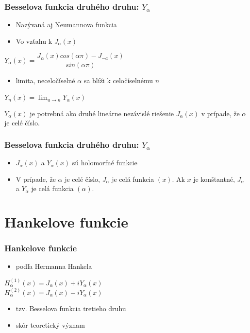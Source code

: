 \documentclass{beamer}
\begin{document}
\begin{frame}
\frametitle{Besselova funkcia druhého druhu: $Y_{\alpha}$}
\begin{itemize}
\item Nazývaná aj Neumannova funkcia
\item Vo vzťahu k $J_{\alpha}(x)$ 
\end{itemize}
\begin{center}
$Y_{\alpha}(x) = \dfrac{J_{\alpha}(x)cos(\alpha\pi)-J_{-a}(x)}{sin(\alpha\pi)} $
\end{center}
\begin{itemize}
\item limita, neceločíselné $\alpha$ sa blíži k celočíselnému $n$
\end{itemize}

\begin{center}
$Y_{n}(x) = \displaystyle\lim_{a\rightarrow n} Y_{\alpha}(x)$
\end{center}
$Y_{\alpha}(x) $ je potrebná ako druhé lineárne nezávislé riešenie $J_{\alpha}(x)$ v prípade, že $\alpha$ je celé číslo.
\end{frame}
\begin{frame}
\frametitle{Besselova funkcia druhého druhu: $Y_{\alpha}$}
\begin{itemize}
\item $J_{\alpha}(x)$ a $Y_{\alpha}(x)$ sú holomorfné funkcie

\item V prípade, že $\alpha$ je celé číslo, $J_{\alpha}$ je celá funkcia $(x)$.
Ak $x$ je konštantné, $J_{\alpha}$ a $Y_{\alpha}$ je celá funkcia $(\alpha)$.
\end{itemize}

\end{frame}

\section{Hankelove funkcie}
\begin{frame}
\frametitle{Hankelove funkcie}
\begin{itemize}
\item podľa Hermanna Hankela
\end{itemize}
\begin{center}
$H_{\alpha}^{(1)}(x) = J_{\alpha}(x) + iY_{\alpha}(x)$\\
$H_{\alpha}^{(2)}(x) = J_{\alpha}(x) - iY_{\alpha}(x)$
\begin{itemize}
\item tzv. Besselova funkcia tretieho druhu
\item skôr teoretický význam

\end{itemize}
\end{center}

\end{frame}
\end{document}
